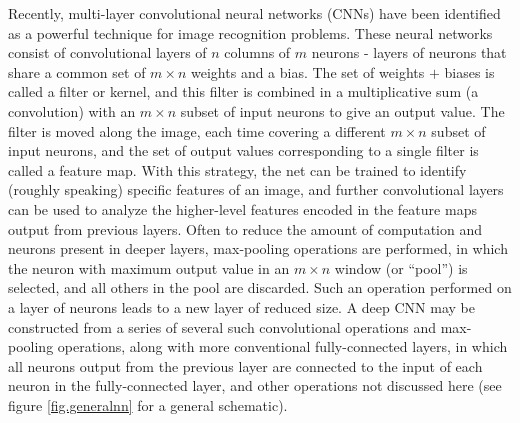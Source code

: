 \documentclass[a4paper,11pt]{article}
\begin{document}
Recently, multi-layer convolutional neural networks (CNNs) have been identified as a powerful technique for image recognition problems.  These neural networks consist of
convolutional layers of $n$ columns of $m$ neurons - layers of neurons that share a common set of $m\times n$ weights and a bias.  The set of 
weights $+$ biases is called a filter or kernel, and this filter is combined in a multiplicative sum (a convolution) with an $m\times n$ subset of input neurons to give an output value.  The filter
is moved along the image, each time covering a different $m\times n$ subset of input neurons, and the set of output values corresponding to a single filter is called a feature map.  With this
strategy, the net can be trained to identify (roughly speaking) specific features of an image, and further convolutional layers can be used to analyze the higher-level features encoded in the feature maps output
from previous layers.  Often to reduce the amount of computation and neurons present in deeper layers, max-pooling operations are performed, in which the neuron with maximum output
value in an $m\times n$ window (or ``pool'') is selected, and all others in the pool are discarded.  Such an operation performed on a layer of neurons leads to a new layer of reduced size.
A deep CNN may be constructed from a series of several such convolutional operations and max-pooling operations, along with more conventional fully-connected layers, in which all neurons 
output from the previous layer are connected to the input of each neuron in the fully-connected layer, and other operations not discussed here (see figure \ref{fig.generalnn} for a general 
schematic).
\end{document}
